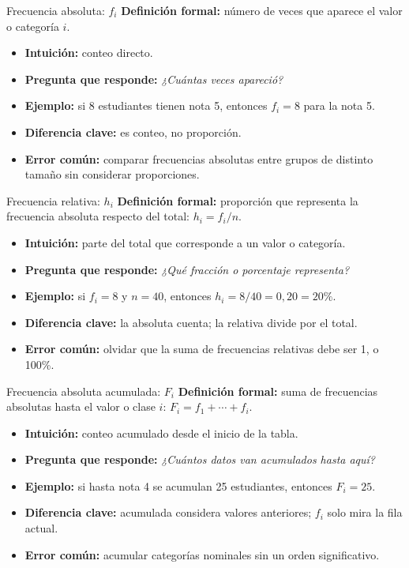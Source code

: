\documentclass[aspectratio=169,11pt]{beamer}
\newcommand{\pregunta}[1]{\textbf{Pregunta que responde:} \emph{#1}}
\newcommand{\errorcomun}[1]{\textbf{Error común:} #1}
\newcommand{\diferencia}[1]{\textbf{Diferencia clave:} #1}
\begin{document}
\begin{frame}{Frecuencia absoluta: $f_i$}
\textbf{Definición formal:} número de veces que aparece el valor o categoría $i$.
\begin{itemize}
  \item \textbf{Intuición:} conteo directo.
  \item \pregunta{¿Cuántas veces apareció?}
  \item \textbf{Ejemplo:} si 8 estudiantes tienen nota 5, entonces $f_i=8$ para la nota 5.
  \item \diferencia{es conteo, no proporción.}
  \item \errorcomun{comparar frecuencias absolutas entre grupos de distinto tamaño sin considerar proporciones.}
\end{itemize}
\end{frame}

\begin{frame}{Frecuencia relativa: $h_i$}
\textbf{Definición formal:} proporción que representa la frecuencia absoluta respecto del total: $h_i = f_i/n$.
\begin{itemize}
  \item \textbf{Intuición:} parte del total que corresponde a un valor o categoría.
  \item \pregunta{¿Qué fracción o porcentaje representa?}
  \item \textbf{Ejemplo:} si $f_i=8$ y $n=40$, entonces $h_i=8/40=0{,}20=20\%$.
  \item \diferencia{la absoluta cuenta; la relativa divide por el total.}
  \item \errorcomun{olvidar que la suma de frecuencias relativas debe ser 1, o 100\%.}
\end{itemize}
\end{frame}

\begin{frame}{Frecuencia absoluta acumulada: $F_i$}
\textbf{Definición formal:} suma de frecuencias absolutas hasta el valor o clase $i$: $F_i=f_1+\cdots+f_i$.
\begin{itemize}
  \item \textbf{Intuición:} conteo acumulado desde el inicio de la tabla.
  \item \pregunta{¿Cuántos datos van acumulados hasta aquí?}
  \item \textbf{Ejemplo:} si hasta nota 4 se acumulan 25 estudiantes, entonces $F_i=25$.
  \item \diferencia{acumulada considera valores anteriores; $f_i$ solo mira la fila actual.}
  \item \errorcomun{acumular categorías nominales sin un orden significativo.}
\end{itemize}
\end{frame}
\end{document}
